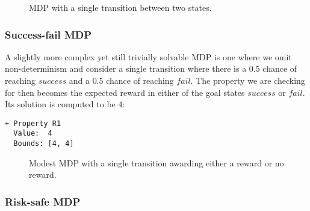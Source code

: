 \begin{figure}[H]
    \centering
    \caption{MDP with a single transition between two states.}
    \label{fig:single-transition-mdp}
\end{figure}

\subsubsection{Success-fail MDP}

A slightly more complex yet still trivially solvable MDP is one where we omit non-determinism and consider a single transition where there is a $0.5$ chance of reaching $success$ and a $0.5$ chance of reaching $fail$. The property we are checking for then becomes the expected reward in either of the goal states $success$ or $fail$. Its solution is computed to be $4$:
\begin{verbatim}
+ Property R1
  Value:  4
  Bounds: [4, 4]
\end{verbatim}

\begin{figure}[H]
    \centering
    \caption{Modest MDP with a single transition awarding either a reward or no reward.}
    \label{fig:success-fail-mdp}
\end{figure}

\subsubsection{Risk-safe MDP}

